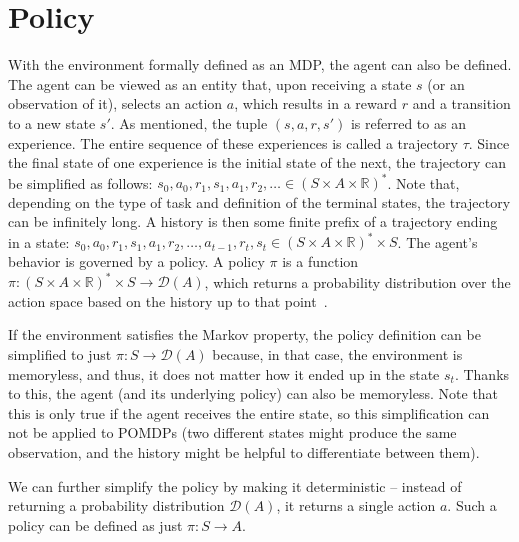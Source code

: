 \documentclass[
  digital,     %
  oneside,     %
  nosansbold,  %
  nocolorbold, %
  lof,         %
  lot,         %
]{fithesis4}
\begin{document}
\section{Policy}
With the environment formally defined as an MDP, the agent can also be defined. The agent can be viewed as an entity that, upon receiving a state $s$ (or an observation of it), selects an action $a$, which results in a reward $r$ and a transition to a new state $s'$. As mentioned, the tuple $(s, a, r, s')$ is referred to as an experience. The entire sequence of these experiences is called a trajectory $\tau$. Since the final state of one experience is the initial state of the next, the trajectory can be simplified as follows: $s_0,a_0,r_1,s_1,a_1,r_2,\dotsc \in (S\times A \times \mathbb{R})^{*}$. Note that, depending on the type of task and definition of the terminal states, the trajectory can be infinitely long. A history is then some finite prefix of a trajectory ending in a state: $s_0,a_0,r_1,s_1,a_1,r_2,\dotsc, a_{t-1},r_t,s_t\in (S\times A \times \mathbb{R})^{*}\times S$.
The agent's behavior is governed by a policy. A policy $\pi$ is a function $\pi\colon (S\times A \times \mathbb{R})^{*}\times S \to \mathcal{D}(A)$, which returns a probability distribution over the action space based on the history up to that point~\cite{PA230}.

If the environment satisfies the Markov property, the policy definition can be simplified to just $\pi\colon S \to \mathcal{D}(A)$ because, in that case, the environment is memoryless, and thus, it does not matter how it ended up in the state $s_t$. Thanks to this, the agent (and its underlying policy) can also be memoryless. Note that this is only true if the agent receives the entire state, so this simplification can not be applied to POMDPs (two different states might produce the same observation, and the history might be helpful to differentiate between them).

We can further simplify the policy by making it deterministic -- instead of returning a probability distribution $\mathcal{D}(A)$, it returns a single action $a$. Such a policy can be defined as just $\pi\colon S\to A$.
\end{document}
